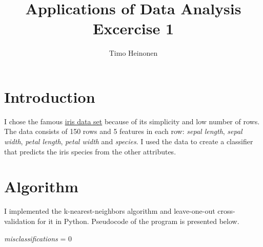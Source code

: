 \documentclass[a4paper]{article}
\title{Applications of Data Analysis\\Excercise 1}
\author{Timo Heinonen}
\begin{document}
  \maketitle

  \section{Introduction}
  I chose the famous \href{http://archive.ics.uci.edu/ml/machine-learning-databases/iris/iris.data}{iris data set} because of its simplicity and low number of rows. The data consists of 150 rows and 5 features in each row: \emph{sepal length}, \emph{sepal width}, \emph{petal length}, \emph{petal width} and \emph{species}. I used the data to create a classifier that predicts the iris species from the other attributes.

  \section{Algorithm}
  I implemented the k-nearest-neighbors algorithm and leave-one-out cross-validation for it in Python. Pseudocode of the program is presented below.\\

  \begin{algorithm}[H]

   \emph{misclassifications} = 0\\

  \end{algorithm}
\end{document}
